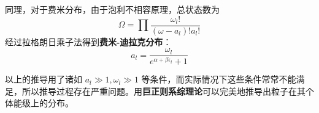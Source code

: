 同理，对于费米分布，由于泡利不相容原理，总状态数为
\begin{equation}
\Omega=\prod \frac{\omega_l!}{(\omega-a_l)!a_l!}
\end{equation}
经过拉格朗日乘子法得到\textbf{费米-迪拉克分布}：
\begin{equation}
a_l=\frac{\omega_l}{e^{\alpha+\beta\epsilon_l}+1}
\end{equation}

以上的推导用了诸如 $a_l\gg 1,\omega_l\gg 1$ 等条件，而实际情况下这些条件常常不能满足，所以推导过程存在严重问题。用\textbf{巨正则系综理论}可以完美地推导出粒子在其个体能级上的分布。

